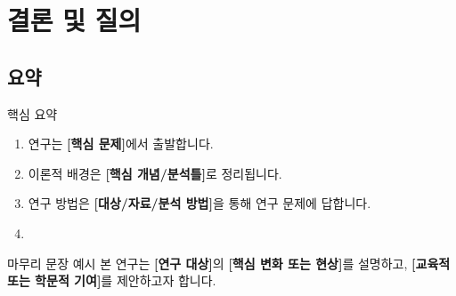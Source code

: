 %

\section{결론 및 질의}

\subsection{요약}

\begin{frame}[t]{\BeamerSummaryFrame}
\small

\begin{block}{핵심 요약}
\begin{enumerate}
\tightitems

\item 연구는 \textbf{[핵심 문제]}에서 출발합니다.
\item 이론적 배경은 \textbf{[핵심 개념/분석틀]}로 정리됩니다.
\item 연구 방법은 \textbf{[대상/자료/분석 방법]}을 통해 연구 문제에 답합니다.
\item {}
\end{enumerate}
\end{block}

\begin{exampleblock}{마무리 문장 예시}
본 연구는 \textbf{[연구 대상]}의 \textbf{[핵심 변화 또는 현상]}를 설명하고, \textbf{[교육적 또는 학문적 기여]}를 제안하고자 합니다.
\end{exampleblock}

\end{frame}

